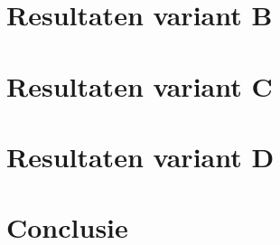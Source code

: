 \section{Resultaten variant B}

\section{Resultaten variant C}

\section{Resultaten variant D}


\section{Conclusie}
